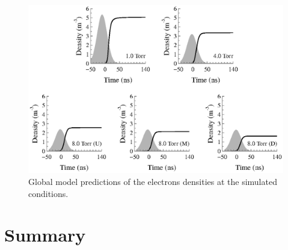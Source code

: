 \begin{figure}
  \centering
  \includegraphics{./chapters/modeling/figures/necomp.eps}
  \caption{Global model predictions of the electrons densities at the simulated
  conditions.}
  \label{fig:necomp}
\end{figure}







\section{Summary}


